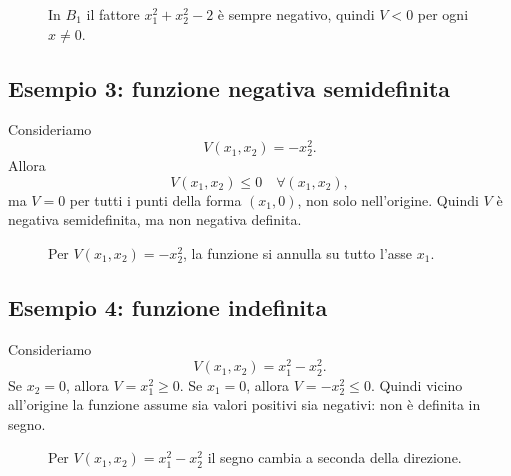 \begin{figure}[h!]
\centering
{}
\caption{In \(B_1\) il fattore \(x_1^2+x_2^2-2\) è sempre negativo, quindi \(V<0\) per ogni \(x\neq 0\).}
\end{figure}

\subsection*{Esempio 3: funzione negativa semidefinita}
Consideriamo
\[
V(x_1,x_2)=-x_2^2.
\]
Allora
\[
V(x_1,x_2)\le 0 \quad \forall (x_1,x_2),
\]
ma \(V=0\) per tutti i punti della forma \((x_1,0)\), non solo nell'origine.  
Quindi \(V\) è negativa semidefinita, ma non negativa definita.

\begin{figure}[h!]
\centering
{}
\caption{Per \(V(x_1,x_2)=-x_2^2\), la funzione si annulla su tutto l'asse \(x_1\).}
\end{figure}

\subsection*{Esempio 4: funzione indefinita}
Consideriamo
\[
V(x_1,x_2)=x_1^2-x_2^2.
\]
Se \(x_2=0\), allora \(V=x_1^2\ge 0\).  
Se \(x_1=0\), allora \(V=-x_2^2\le 0\).  
Quindi vicino all'origine la funzione assume sia valori positivi sia negativi: non è definita in segno.

\begin{figure}[h!]
\centering
{}
\caption{Per \(V(x_1,x_2)=x_1^2-x_2^2\) il segno cambia a seconda della direzione.}
\end{figure}

